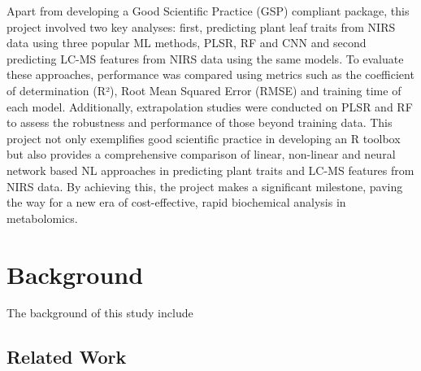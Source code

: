 \documentclass[12pt,a4paper]{report}
\begin{document}
Apart from developing a Good Scientific Practice (GSP) compliant package, this project involved two key analyses: first, predicting plant leaf traits from NIRS data using three popular ML methods, PLSR, RF and CNN and second predicting LC-MS features from NIRS data using the same models. To evaluate these approaches, performance was compared using metrics such as the coefficient of determination (R²), Root Mean Squared Error (RMSE) and training time of each model. Additionally,
extrapolation studies were conducted on PLSR and RF to assess the robustness and performance of those beyond training data. This project not only exemplifies good scientific practice in developing an R toolbox but also provides a comprehensive comparison of linear, non-linear and neural network based NL approaches in predicting plant traits and LC-MS features from NIRS data. By achieving this, the project makes a significant milestone, paving the way for a new era of cost-effective, rapid biochemical analysis in metabolomics. \\



\chapter{Background}
The background of this study include
\section{Related Work}
\end{document}
